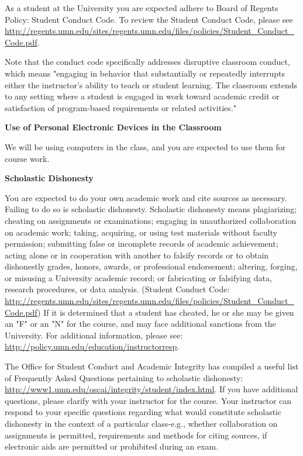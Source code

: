 \documentclass[11pt]{article}
\begin{document}
As a student at the University you are expected adhere to Board of Regents Policy: Student Conduct Code. To review the Student Conduct Code, please see \url{http://regents.umn.edu/sites/regents.umn.edu/files/policies/Student_Conduct_Code.pdf}.

Note that the conduct code specifically addresses disruptive classroom conduct, which means "engaging in behavior that substantially or repeatedly interrupts either the instructor's ability to teach or student learning. The classroom extends to any setting where a student is engaged in work toward academic credit or satisfaction of program-based requirements or related activities."


\vspace{10pt}
\noindent\textbf{Use of Personal Electronic Devices in the Classroom}

\hspace{3mm}
We will be using computers in the class, and you are expected to use them for course work.

\vspace{10pt}
\noindent\textbf{Scholastic Dishonesty}

\hspace{3mm}
You are expected to do your own academic work and cite sources as necessary. Failing to do so is scholastic dishonesty. Scholastic dishonesty means plagiarizing; cheating on assignments or examinations; engaging in unauthorized collaboration on academic work; taking, acquiring, or using test materials without faculty permission; submitting false or incomplete records of academic achievement; acting alone or in cooperation with another to falsify records or to obtain dishonestly grades, honors, awards, or professional endorsement; altering, forging, or misusing a University academic record; or fabricating or falsifying data, research procedures, or data analysis. (Student Conduct Code: \url{http://regents.umn.edu/sites/regents.umn.edu/files/policies/Student_Conduct_Code.pdf}) If it is determined that a student has cheated, he or she may be given an "F" or an "N" for the course, and may face additional sanctions from the University. For additional information, please see: \url{http://policy.umn.edu/education/instructorresp}.

The Office for Student Conduct and Academic Integrity has compiled a useful list of Frequently Asked Questions pertaining to scholastic dishonesty: \url{http://www1.umn.edu/oscai/integrity/student/index.html}. If you have additional questions, please clarify with your instructor for the course. Your instructor can respond to your specific questions regarding what would constitute scholastic dishonesty in the context of a particular class-e.g., whether collaboration on assignments is permitted, requirements and methods for citing sources, if electronic aids are permitted or prohibited during an exam.
\end{document}

